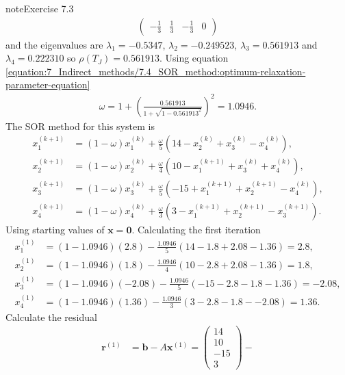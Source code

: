 \documentclass[letterpaper,10pt,english]{jupyterBook}
\begin{document}
\begin{sphinxadmonition}{note}{Exercise 7.3}
\begin{align*}
\begin{pmatrix}
        - \frac{1}{3} & \frac{1}{3} & - \frac{1}{3} & 0
    \end{pmatrix}
\end{align*}
\sphinxAtStartPar
and the eigenvalues are \(\lambda_1 = -0.5347\), \(\lambda_2 = -0.249523\), \(\lambda_3 = 0.561913\) and \(\lambda_4 =  0.222310\) so \(\rho(T_J) = 0.561913\). Using equation \eqref{equation:7_Indirect_methods/7.4_SOR_method:optimum-relaxation-parameter-equation}
\begin{align*}
    \omega = 1 + \left( \frac{0.561913}{1 + \sqrt{1 - 0.561913^2}} \right)^2 = 1.0946.
\end{align*}
\sphinxAtStartPar
The SOR method for this system is
\begin{align*}
    x_{1}^{(k+1)} &= (1 - \omega)x_{1}^{(k)} + \frac{\omega}{5} \left( 14 - x_{2}^{(k)} + x_{3}^{(k)} - x_{4}^{(k)} \right), \\
    x_{2}^{(k+1)} &= (1 - \omega)x_{2}^{(k)} + \frac{\omega}{4} \left( 10 - x_{1}^{(k+1)} + x_{3}^{(k)} + x_{4}^{(k)} \right), \\
    x_{3}^{(k+1)} &= (1 - \omega)x_{3}^{(k)} + \frac{\omega}{5} \left( -15 + x_{1}^{(k+1)} + x_{2}^{(k+1)} - x_{4}^{(k)} \right), \\
    x_{4}^{(k+1)} &= (1 - \omega)x_{4}^{(k)} + \frac{\omega}{3} \left( 3 - x_{1}^{(k+1)} + x_{2}^{(k+1)} - x_{3}^{(k+1)} \right).
\end{align*}
\sphinxAtStartPar
Using starting values of \(\mathbf{x} = \mathbf{0}\). Calculating the first iteration
\begin{align*}
    x_{1}^{(1)} &= (1 - 1.0946)(2.8) - \frac{1.0946}{5} \left( 14 - 1.8 + 2.08 - 1.36 \right) = 2.8, \\
    x_{2}^{(1)} &= (1 - 1.0946)(1.8) - \frac{1.0946}{4} \left( 10 - 2.8 + 2.08 - 1.36 \right) = 1.8, \\
    x_{3}^{(1)} &= (1 - 1.0946)(-2.08) - \frac{1.0946}{5} \left( -15 - 2.8 - 1.8 - 1.36 \right) = -2.08, \\
    x_{4}^{(1)} &= (1 - 1.0946)(1.36) - \frac{1.0946}{3} \left( 3 - 2.8 - 1.8 - -2.08 \right) = 1.36.
\end{align*}
\sphinxAtStartPar
Calculate the residual
\begin{align*}
    \mathbf{r}^{(1)} &= \mathbf{b} - A \mathbf{x}^{(1)} = 
    \begin{pmatrix} 14 \\ 10 \\ -15 \\ 3 \end{pmatrix} -

\end{align*}
\end{sphinxadmonition}
\end{document}
